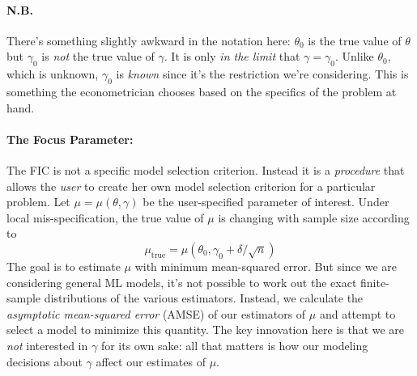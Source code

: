 \documentclass[12pt]{article}
\theoremstyle{definition}
\begin{document}
\paragraph{N.B.} There's something slightly awkward in the notation here: $\theta_0$ is the true value of $\theta$ but $\gamma_0$ is \emph{not} the true value of $\gamma$. It is only \emph{in the limit} that $\gamma = \gamma_0$. Unlike $\theta_0$, which is unknown, $\gamma_0$ is \emph{known} since it's the restriction we're considering. This is something the econometrician chooses based on the specifics of the problem at hand.

\paragraph{The Focus Parameter:} The FIC is not a specific model selection criterion. Instead it is a \emph{procedure} that allows the \emph{user} to create her own model selection criterion for a particular problem. Let $\mu = \mu(\theta, \gamma)$ be the user-specified parameter of interest. Under local mis-specification, the true value of $\mu$ is changing with sample size according to
	$$\mu_{\mbox{true}} = \mu\left(\theta_0, \gamma_0 + \delta/\sqrt{n}\right)$$ 
The goal is to estimate $\mu$ with minimum mean-squared error. But since we are considering general ML models, it's not possible to work out the exact finite-sample distributions of the various estimators. Instead, we calculate the \emph{asymptotic mean-squared error} (AMSE) of our estimators of $\mu$ and attempt to select a model to minimize this quantity. The key innovation here is that we are \emph{not} interested in $\gamma$ for its own sake: all that matters is how our modeling decisions about $\gamma$ affect our estimates of $\mu$.
\end{document}
